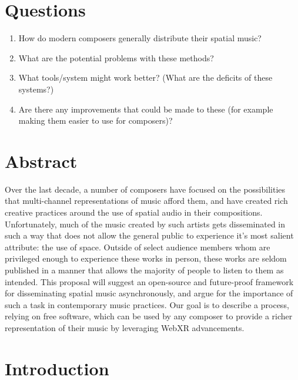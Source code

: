 



\section{Questions}
\begin{enumerate}
    \item How do modern composers generally distribute their spatial music? 
    \item What are the potential problems with these methods?
    \item What tools/system might work better? (What are the deficits of these systems?)
    \item Are there any improvements that could be made to these (for example making them easier to use for composers)? 
\end{enumerate}
    
\section{Abstract}

Over the last decade, a number of composers have focused on the possibilities that multi-channel representations of music afford them, and have created rich creative practices around the use of spatial audio in their compositions. Unfortunately, much of the music created by such artists gets disseminated in such a way that does not allow the general public to experience it's most salient attribute: the use of space. Outside of select audience members whom are privileged enough to experience these works in person, these works are seldom published in a manner that allows the majority of people to listen to them as intended. This proposal will suggest an open-source and future-proof framework for disseminating spatial music asynchronously, and argue for the importance of such a task in contemporary music practices. Our goal is to describe a process, relying on free software, which can be used by any composer to provide a richer representation of their music by leveraging WebXR advancements. 

\section{Introduction}

